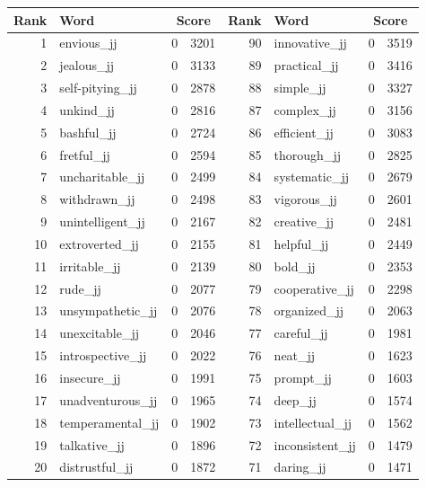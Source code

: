 \begin{table}[tbp]
    \begin{tabular}{| rlr@{.}l | rlr@{.}l |}
    \hline
    \textbf{Rank} & \textbf{Word} & \multicolumn{2}{c|}{\textbf{Score}} & \textbf{Rank} & \textbf{Word} & \multicolumn{2}{c|}{\textbf{Score}} \\
    \hline
    1 & envious\_jj & 0 & 3201    &    90 & innovative\_jj & 0 & 3519 \\
    2 & jealous\_jj & 0 & 3133    &    89 & practical\_jj & 0 & 3416 \\
    3 & self-pitying\_jj & 0 & 2878    &    88 & simple\_jj & 0 & 3327 \\
    4 & unkind\_jj & 0 & 2816    &    87 & complex\_jj & 0 & 3156 \\
    5 & bashful\_jj & 0 & 2724    &    86 & efficient\_jj & 0 & 3083 \\
    6 & fretful\_jj & 0 & 2594    &    85 & thorough\_jj & 0 & 2825 \\
    7 & uncharitable\_jj & 0 & 2499    &    84 & systematic\_jj & 0 & 2679 \\
    8 & withdrawn\_jj & 0 & 2498    &    83 & vigorous\_jj & 0 & 2601 \\
    9 & unintelligent\_jj & 0 & 2167    &    82 & creative\_jj & 0 & 2481 \\
    10 & extroverted\_jj & 0 & 2155    &    81 & helpful\_jj & 0 & 2449 \\
    11 & irritable\_jj & 0 & 2139    &    80 & bold\_jj & 0 & 2353 \\
    12 & rude\_jj & 0 & 2077    &    79 & cooperative\_jj & 0 & 2298 \\
    13 & unsympathetic\_jj & 0 & 2076    &    78 & organized\_jj & 0 & 2063 \\
    14 & unexcitable\_jj & 0 & 2046    &    77 & careful\_jj & 0 & 1981 \\
    15 & introspective\_jj & 0 & 2022    &    76 & neat\_jj & 0 & 1623 \\
    16 & insecure\_jj & 0 & 1991    &    75 & prompt\_jj & 0 & 1603 \\
    17 & unadventurous\_jj & 0 & 1965    &    74 & deep\_jj & 0 & 1574 \\
    18 & temperamental\_jj & 0 & 1902    &    73 & intellectual\_jj & 0 & 1562 \\
    19 & talkative\_jj & 0 & 1896    &    72 & inconsistent\_jj & 0 & 1479 \\
    20 & distrustful\_jj & 0 & 1872    &    71 & daring\_jj & 0 & 1471 \\

\end{tabular}
\end{table}
